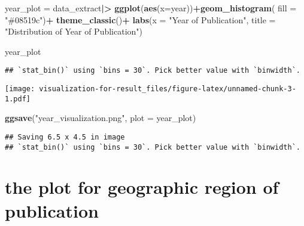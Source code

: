 \documentclass[
]{article}
\newenvironment{Shaded}{\begin{snugshade}}{\end{snugshade}}
\newcommand{\AttributeTok}[1]{\textcolor[rgb]{0.13,0.29,0.53}{#1}}
\newcommand{\FunctionTok}[1]{\textcolor[rgb]{0.13,0.29,0.53}{\textbf{#1}}}
\newcommand{\NormalTok}[1]{#1}
\newcommand{\OtherTok}[1]{\textcolor[rgb]{0.56,0.35,0.01}{#1}}
\newcommand{\SpecialCharTok}[1]{\textcolor[rgb]{0.81,0.36,0.00}{\textbf{#1}}}
\newcommand{\StringTok}[1]{\textcolor[rgb]{0.31,0.60,0.02}{#1}}
\begin{document}
\begin{Shaded}
\begin{Highlighting}[]
\NormalTok{year\_plot }\OtherTok{=}
\NormalTok{data\_extract}\SpecialCharTok{|\textgreater{}}
  \FunctionTok{ggplot}\NormalTok{(}\FunctionTok{aes}\NormalTok{(}\AttributeTok{x=}\NormalTok{year))}\SpecialCharTok{+}\FunctionTok{geom\_histogram}\NormalTok{( }\AttributeTok{fill =} \StringTok{"\#08519c"}\NormalTok{)}\SpecialCharTok{+}
  \FunctionTok{theme\_classic}\NormalTok{()}\SpecialCharTok{+}
  \FunctionTok{labs}\NormalTok{(}\AttributeTok{x =} \StringTok{"Year of Publication"}\NormalTok{,}
       \AttributeTok{title =} \StringTok{"Distribution of Year of Publication"}\NormalTok{)}

\NormalTok{year\_plot}
\end{Highlighting}
\end{Shaded}

\begin{verbatim}
## `stat_bin()` using `bins = 30`. Pick better value with `binwidth`.
\end{verbatim}

\texttt{[image: visualization-for-result\_files/figure-latex/unnamed-chunk-3-1.pdf]}

\begin{Shaded}
\begin{Highlighting}[]
\FunctionTok{ggsave}\NormalTok{(}\StringTok{"year\_visualization.png"}\NormalTok{, }\AttributeTok{plot =}\NormalTok{ year\_plot)}
\end{Highlighting}
\end{Shaded}

\begin{verbatim}
## Saving 6.5 x 4.5 in image
## `stat_bin()` using `bins = 30`. Pick better value with `binwidth`.
\end{verbatim}

\section{the plot for geographic region of
publication}\label{the-plot-for-geographic-region-of-publication}
\end{document}
